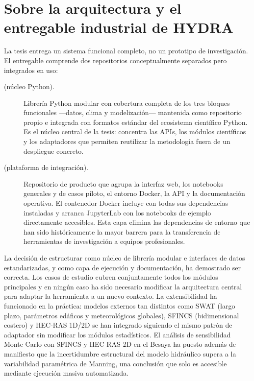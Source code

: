 \section{Sobre la arquitectura y el entregable industrial de HYDRA}

La tesis entrega un sistema funcional completo, no un prototipo de investigación. El entregable comprende dos repositorios conceptualmente separados pero integrados en uso:

\begin{description}
  \item[\pyhydra (núcleo Python).] Librería Python modular con cobertura completa de los tres bloques funcionales ---datos, clima y modelización--- mantenida como repositorio propio e integrada con formatos estándar del ecosistema científico Python. Es el núcleo central de la tesis: concentra las APIs, los módulos científicos y los adaptadores que permiten reutilizar la metodología fuera de un despliegue concreto.

  \item[\hydra (plataforma de integración).] Repositorio de producto que agrupa la interfaz web, los notebooks generales y de casos piloto, el entorno Docker, la API y la documentación operativa. El contenedor Docker incluye \pyhydra con todas sus dependencias instaladas y arranca JupyterLab con los notebooks de ejemplo directamente accesibles. Esta capa elimina las dependencias de entorno que han sido históricamente la mayor barrera para la transferencia de herramientas de investigación a equipos profesionales.
\end{description}

La decisión de estructurar \pyhydra como núcleo de librería modular e interfaces de datos estandarizadas, y \hydra como capa de ejecución y documentación, ha demostrado ser correcta. Los casos de estudio cubren conjuntamente todos los módulos principales y en ningún caso ha sido necesario modificar la arquitectura central para adaptar la herramienta a un nuevo contexto. La extensibilidad ha funcionado en la práctica: modelos externos tan distintos como SWAT (largo plazo, parámetros edáficos y meteorológicos globales), SFINCS (bidimensional costero) y HEC-RAS 1D/2D se han integrado siguiendo el mismo patrón de adaptador sin modificar los módulos estadísticos. El análisis de sensibilidad Monte Carlo con SFINCS y HEC-RAS 2D en el Besaya \parencite{navas2025roughness} ha puesto además de manifiesto que la incertidumbre estructural del modelo hidráulico supera a la variabilidad paramétrica de Manning, una conclusión que solo es accesible mediante ejecución masiva automatizada.

